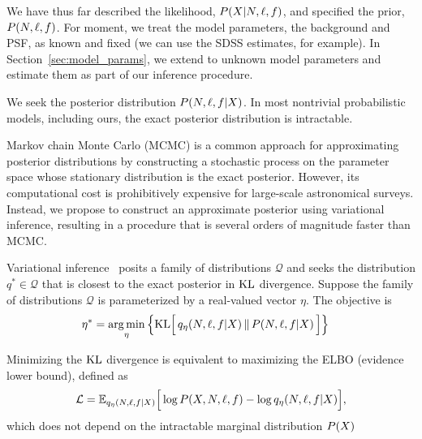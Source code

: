 We have thus far described the likelihood,
$P(X | N, \ell, f)$, and specified the prior, $P(N, \ell, f)$. 
For moment, we treat the model parameters, the background and PSF, as known and fixed
(we can use the SDSS estimates, for example). In Section~\ref{sec:model_params}, we extend to unknown 
model parameters and estimate them as part of our inference procedure. 

We seek the posterior distribution 
$P(N, \ell, f | X)$. In most nontrivial probabilistic models, including ours, the exact posterior distribution is intractable.

Markov chain Monte Carlo (MCMC) is a common approach for approximating
posterior distributions by constructing a stochastic process on the parameter space whose stationary distribution is the exact posterior.
However, its computational cost is prohibitively expensive for
large-scale astronomical surveys. Instead, we propose to construct an approximate posterior using variational inference, resulting in a procedure that is several orders of magnitude faster than MCMC.

Variational inference~\cite{Blei_2017_vi_review, Jordan_intro_vi, Wainwrite_graph_models_vi}
posits a family of distributions $\mathcal{Q}$ and seeks
the distribution $q^*\in \mathcal{Q}$ that is closest to the exact posterior
in $\textrm{KL}$ divergence. Suppose the family of distributions $\mathcal{Q}$ is parameterized by a real-valued vector $\eta$. The objective is 
\begin{align}
   \eta^* &= \operatorname*{arg\,min}_{\eta} \Big\{ \mathrm{KL}\Big[\,q_\eta(N, \ell, f | X)\, \| \,P(N, \ell, f | X )\,\Big]\Big\} 
   \label{eq:kl_objective}
\end{align}

Minimizing the $\textrm{KL}$ divergence is equivalent to maximizing the ELBO (evidence lower bound), defined as 
\begin{align}
    \mathcal{L} = 
    \mathbb{E}_{q_\eta(N, \ell, f | X)}\Big[\log P(X, N, \ell, f) - \log q_\eta(N, \ell, f | X)\Big],
    \label{eq:elbo}
\end{align}
which does not depend on the intractable marginal distribution $P(X)$

